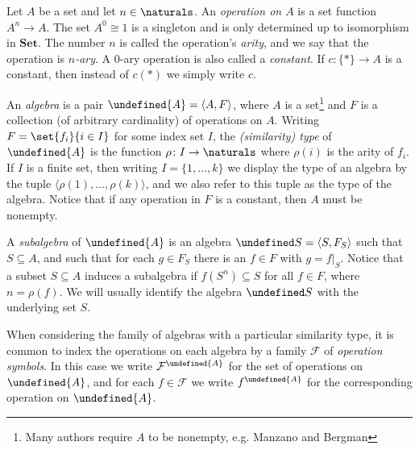 \documentclass[article, a4paper, 11pt, oneside]{memoir}
\let\mathfrak\undefined
\numberwithin{equation}{chapter}
\newcommand{\calF}{\mathcal{F}}
\newcommand{\frakA}{\mathfrak{A}}
\newcommand{\ncat}[1]{\mathbf{#1}} %
\newcommand{\catSet}{\ncat{Set}} %
\theoremstyle{nonumberplain}
\begin{document}
\begin{remarkbreak}
    Let $A$ be a set and let $n \in \naturals$. An \emph{operation on $A$} is a set function $A^n \to A$. The set $A^0 \cong 1$ is a singleton and is only determined up to isomorphism in $\catSet$. The number $n$ is called the operation's \emph{arity}, and we say that the operation is \emph{$n$-ary}. A $0$-ary operation is also called a \emph{constant}. If $c \colon \{*\} \to A$ is a constant, then instead of $c(*)$ we simply write $c$.
    
    An \emph{algebra} is a pair $\frakA = \langle A, F \rangle$, where $A$ is a set\footnote{Many authors require $A$ to be nonempty, e.g. Manzano and Bergman} and $F$ is a collection (of arbitrary cardinality) of operations on $A$. Writing $F = \set{f_i}{i \in I}$ for some index set $I$, the \emph{(similarity) type} of $\frakA$ is the function $\rho \colon I \to \naturals$ where $\rho(i)$ is the arity of $f_i$. If $I$ is a finite set, then writing $I = \{1, \ldots, k\}$ we display the type of an algebra by the tuple $\langle \rho(1), \ldots, \rho(k) \rangle$, and we also refer to this tuple as the type of the algebra. Notice that if any operation in $F$ is a constant, then $A$ must be nonempty.

    A \emph{subalgebra} of $\frakA$ is an algebra $\frakS = \langle S, F_S \rangle$ such that $S \subseteq A$, and such that for each $g \in F_S$ there is an $f \in F$ with $g = f|_S$. Notice that a subset $S \subseteq A$ induces a subalgebra if $f(S^n) \subseteq S$ for all $f \in F$, where $n = \rho(f)$. We will usually identify the algebra $\frakS$ with the underlying set $S$.

    When considering the family of algebras with a particular similarity type, it is common to index the operations on each algebra by a family $\calF$ of \emph{operation symbols}. In this case we write $\calF^\frakA$ for the set of operations on $\frakA$, and for each $f \in \calF$ we write $f^\frakA$ for the corresponding operation on $\frakA$.


\end{remarkbreak}
\end{document}
